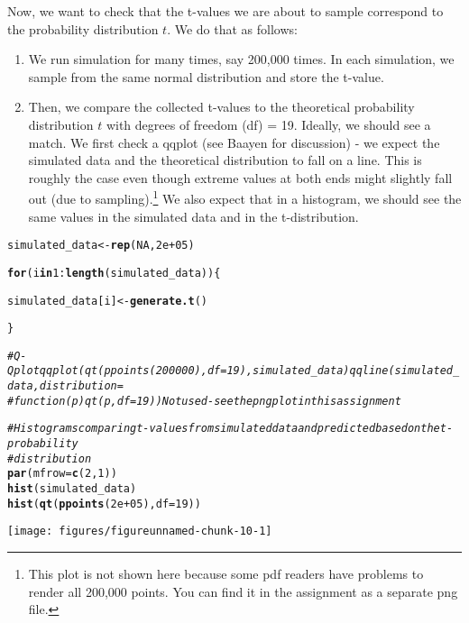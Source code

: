 \documentclass{article}\usepackage[]{graphicx}\usepackage[]{color}
\makeatletter
\def\maxwidth{ %
  \ifdim\Gin@nat@width>\linewidth
    \linewidth
  \else
    \Gin@nat@width
  \fi
}
\newcommand{\hlnum}[1]{\textcolor[rgb]{0.686,0.059,0.569}{#1}}%
\newcommand{\hlcom}[1]{\textcolor[rgb]{0.678,0.584,0.686}{\textit{#1}}}%
\newcommand{\hlopt}[1]{\textcolor[rgb]{0,0,0}{#1}}%
\newcommand{\hlstd}[1]{\textcolor[rgb]{0.345,0.345,0.345}{#1}}%
\newcommand{\hlkwa}[1]{\textcolor[rgb]{0.161,0.373,0.58}{\textbf{#1}}}%
\newcommand{\hlkwb}[1]{\textcolor[rgb]{0.69,0.353,0.396}{#1}}%
\newcommand{\hlkwc}[1]{\textcolor[rgb]{0.333,0.667,0.333}{#1}}%
\newcommand{\hlkwd}[1]{\textcolor[rgb]{0.737,0.353,0.396}{\textbf{#1}}}%
\newenvironment{kframe}{%
 \def\at@end@of@kframe{}%
 \ifinner\ifhmode%
  \def\at@end@of@kframe{\end{minipage}}%
  \begin{minipage}{\columnwidth}%
 \fi\fi%
 \def\FrameCommand##1{\hskip\@totalleftmargin \hskip-\fboxsep
 \colorbox{shadecolor}{##1}\hskip-\fboxsep
     \hskip-\linewidth \hskip-\@totalleftmargin \hskip\columnwidth}%
 \MakeFramed {\advance\hsize-\width
   \@totalleftmargin\z@ \linewidth\hsize
   \@setminipage}}%
 {\par\unskip\endMakeFramed%
 \at@end@of@kframe}
\newenvironment{knitrout}{}{} %
\makeatother
\begin{document}
Now, we want to check that the t-values we are about to sample correspond to the probability distribution $t$. We do that as follows:

\begin{enumerate}
    \item We run simulation for many times, say 200,000 times. In each simulation, we sample from the same normal distribution and store the t-value.
    \item Then, we compare the collected t-values to the theoretical probability distribution $t$ with degrees of freedom (df) = 19. Ideally, we should see a match. We first check a qqplot (see Baayen for discussion) - we expect the simulated data and the theoretical distribution to fall on a line. This is roughly the case even though extreme values at both ends might slightly fall out (due to sampling).\footnote{This plot is not shown here because some pdf readers have problems to render all 200,000 points. You can find it in the assignment as a separate png file.} We also expect that in a histogram, we should see the same values in the simulated data and in the t-distribution.
\end{enumerate}

\begin{knitrout}
\color{fgcolor}\begin{kframe}
\begin{alltt}
\hlstd{simulated_data} \hlkwb{<-} \hlkwd{rep}\hlstd{(}\hlnum{NA}\hlstd{,} \hlnum{2e+05}\hlstd{)}

\hlkwa{for} \hlstd{(i} \hlkwa{in} \hlnum{1}\hlopt{:}\hlkwd{length}\hlstd{(simulated_data)) \{}

    \hlstd{simulated_data[i]} \hlkwb{<-} \hlkwd{generate.t}\hlstd{()}

\hlstd{\}}

\hlcom{# Q-Q plot qqplot(qt(ppoints(200000), df=19), simulated_data) qqline(simulated_data, distribution=}
\hlcom{# function(p) qt(p, df=19)) Not used - see the png plot in this assignment}


\hlcom{# Histograms comparing t-values from simulated data and predicted based on the t-probability}
\hlcom{# distribution}
\hlkwd{par}\hlstd{(}\hlkwc{mfrow} \hlstd{=} \hlkwd{c}\hlstd{(}\hlnum{2}\hlstd{,} \hlnum{1}\hlstd{))}
\hlkwd{hist}\hlstd{(simulated_data)}
\hlkwd{hist}\hlstd{(}\hlkwd{qt}\hlstd{(}\hlkwd{ppoints}\hlstd{(}\hlnum{2e+05}\hlstd{),} \hlkwc{df} \hlstd{=} \hlnum{19}\hlstd{))}
\end{alltt}
\end{kframe}
\texttt{[image: figures/figureunnamed-chunk-10-1]} 

\end{knitrout}
\end{document}
